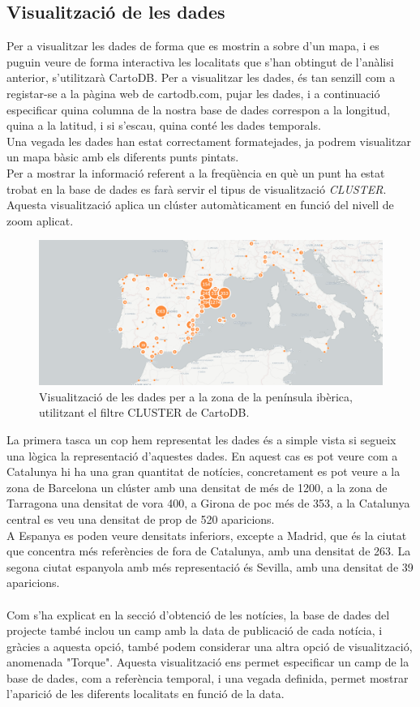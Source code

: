 \documentclass[12pt,a4paper,openright,oneside]{article}
\numberwithin{equation}{section}
\theoremstyle{definition}
\begin{document}
\subsection{Visualització de les dades}
Per a visualitzar les dades de forma que es mostrin a sobre d'un mapa, i es puguin veure de forma interactiva les localitats que s'han obtingut de l'anàlisi anterior, s'utilitzarà CartoDB. Per a visualitzar les dades, és tan senzill com a registar-se a la pàgina web de cartodb.com, pujar les dades, i a continuació especificar quina columna de la nostra base de dades correspon a la longitud, quina a la latitud, i si s'escau, quina conté les dades temporals.\\
Una vegada les dades han estat correctament formatejades, ja podrem visualitzar un mapa bàsic amb els diferents punts pintats.\\
Per a mostrar la informació referent a la freqüència en què un punt ha estat trobat en la base de dades es farà servir el tipus de visualització \emph{CLUSTER}. Aquesta visualització aplica un clúster automàticament en funció del nivell de zoom aplicat. 

\begin{figure}[!htbp]
\centering
\includegraphics[width=12cm]{cartodb-1.png}
\caption{Visualització de les dades per a la zona de la península ibèrica, utilitzant el filtre CLUSTER de CartoDB.}
\end{figure}

La primera tasca un cop hem representat les dades és a simple vista si segueix una lògica la representació d'aquestes dades. En aquest cas es pot veure com a Catalunya hi ha una gran quantitat de notícies, concretament es pot veure a la zona de Barcelona un clúster amb una densitat de més de 1200, a la zona de Tarragona una densitat de vora 400, a Girona de poc més de 353, a la Catalunya central es veu una densitat de prop de 520 aparicions.\\
A Espanya es poden veure densitats inferiors, excepte a Madrid, que és la ciutat que concentra més referències de fora de Catalunya, amb una densitat de 263. La segona ciutat espanyola amb més representació és Sevilla, amb una densitat de 39 aparicions.\\ \\
Com s'ha explicat en la secció d'obtenció de les notícies, la base de dades del projecte també inclou un camp amb la data de publicació de cada notícia, i gràcies a aquesta opció, també podem considerar una altra opció de visualització, anomenada "Torque". Aquesta visualització ens permet especificar un camp de la base de dades, com a referència temporal, i una vegada definida, permet mostrar l'aparició de les diferents localitats en funció de la data.
\end{document}
